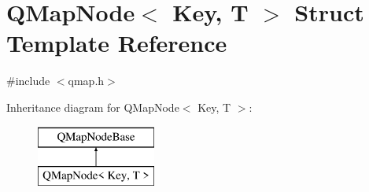 \hypertarget{struct_q_map_node}{}\section{Q\+Map\+Node$<$ Key, T $>$ Struct Template Reference}
\label{struct_q_map_node}


{\ttfamily \#include $<$qmap.\+h$>$}

Inheritance diagram for Q\+Map\+Node$<$ Key, T $>$\+:\begin{figure}[H]
\begin{center}
\leavevmode
\includegraphics[height=2.000000cm]{struct_q_map_node}
\end{center}
\end{figure}
